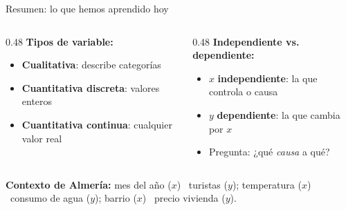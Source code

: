 \documentclass[aspectratio=169, 10pt, spanish]{beamer}
\begin{document}
\begin{frame}{Resumen: lo que hemos aprendido hoy}
  \begin{resumenbox}
    \begin{columns}[T]
      \begin{column}{0.48\textwidth}
        \textbf{Tipos de variable:}
        \begin{itemize}
          \item \textbf{Cualitativa}: describe categorías
          \item \textbf{Cuantitativa discreta}: valores enteros
          \item \textbf{Cuantitativa continua}: cualquier valor real
        \end{itemize}
      \end{column}
      \begin{column}{0.48\textwidth}
        \textbf{Independiente vs. dependiente:}
        \begin{itemize}
          \item $x$ \textbf{independiente}: la que controla o causa
          \item $y$ \textbf{dependiente}: la que cambia por $x$
          \item Pregunta: ¿qué \textit{causa} a qué?
        \end{itemize}
      \end{column}
    \end{columns}

    \vspace{0.3cm}
    \separador
    \vspace{0.2cm}
    \AlmFontSmall
    \textbf{Contexto de Almería:} mes del año ($x$) \textrightarrow\ turistas ($y$);
    temperatura ($x$) \textrightarrow\ consumo de agua ($y$);
    barrio ($x$) \textrightarrow\ precio vivienda ($y$).
  \end{resumenbox}

  \vspace{0.2cm}
  \begin{center}
    \quad
    \quad
    \quad
  \end{center}
\end{frame}
\end{document}

